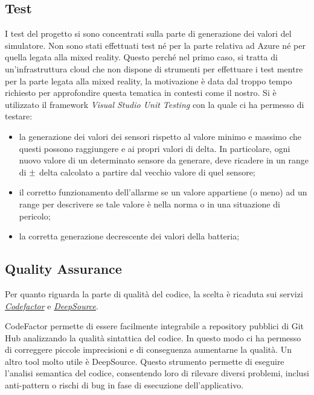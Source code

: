\subsection{Test}
I test del progetto si sono concentrati sulla parte di generazione dei valori del simulatore. Non sono stati effettuati test né per la parte relativa ad Azure né per quella legata alla mixed reality. Questo perché nel primo caso, si tratta di un'infrastruttura cloud che non dispone di strumenti per effettuare i test mentre per la parte legata alla mixed reality, la motivazione è data dal troppo tempo richiesto per approfondire questa tematica in contesti come il nostro. \newline \newline Si è utilizzato il framework \textit{Visual Studio Unit Testing} con la quale ci ha permesso di testare:
\begin{itemize}
    \item la generazione dei valori dei sensori rispetto al valore minimo e massimo che questi possono raggiungere e ai propri valori di delta. In particolare, ogni nuovo valore di un determinato sensore da generare, deve ricadere in un range di $\mypm$ delta calcolato a partire dal vecchio valore di quel sensore;
    
    \item il corretto funzionamento dell'allarme se un valore appartiene (o meno) ad un range per descrivere se tale valore è nella norma o in una situazione di pericolo;
    
    \item la corretta generazione decrescente dei valori della batteria;
\end{itemize}

\subsection{Quality Assurance}
Per quanto riguarda la parte di qualità del codice, la scelta è ricaduta sui servizi \href{https://www.codefactor.io/}{\textit{Codefactor}} e \href{https://deepsource.io/}{\textit{DeepSource}}. \newline \par{CodeFactor} permette di essere facilmente integrabile a repository pubblici di Git Hub analizzando la qualità sintattica del codice. In questo modo ci ha permesso di correggere piccole imprecisioni e di conseguenza aumentarne la qualità. \newline \newline Un altro tool molto utile è DeepSource. Questo strumento permette di eseguire l'analisi semantica del codice, consentendo loro di rilevare diversi problemi, inclusi anti-pattern o rischi di bug in fase di esecuzione dell'applicativo.

